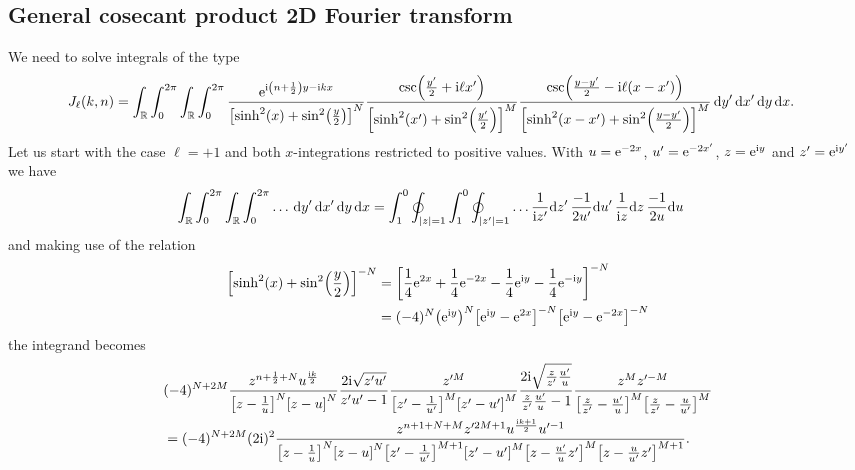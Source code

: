 \documentclass[english, parskip=full]{scrartcl}
\begin{document}
\subsection{General cosecant product 2D Fourier transform}
We need to solve integrals of the type
\begin{align}
J_\ell(k,n) &= \intr{\intx{0}{2\pi}{\intr{\intx{0}{2\pi}{\frac{\powe{\i \kla*{n + \frac{1}{2}}y - \i kx}}{\klb*{\sinh^2(x) + \sin^2\kla*{\frac{y}{2}}}^N} \frac{\csc\kla*{\frac{y'}{2} + \i\ell x'}}{\klb*{\sinh^2(x') + \sin^2\kla*{\frac{y'}{2}}}^M} \frac{\csc\kla*{\frac{y-y'}{2} - \i\ell (x-x')}}{\klb*{\sinh^2(x-x') + \sin^2\kla*{\frac{y-y'}{2}}}^M} }{y'}}{x'} }{y}}{x}.
\end{align}
Let us start with the case $\ell=+1$ and both $x$-integrations restricted to positive values.
With $u = \text{e}^{-2x}$, $u' = \text{e}^{-2x'}$, $z=\text{e}^{\text{i} y}$ and $z'=\text{e}^{\text{i} y'}$ we have
\begin{align}
\int_{\mathbb{R}} \int_{0}^{2\pi} \int_{\mathbb{R}} \int_{0}^{2\pi}  \dots  \,\mathrm{d}y' \, \mathrm{d}x' \,\mathrm{d}y \, \mathrm{d}x &= \int_1^0 \oint_{|z|=1} \int_1^0 \oint_{|z'|=1} \dots \frac{1}{\text{i} z'} \text{d} z'\, \frac{-1}{2u'} \text{d} u'\, \frac{1}{\text{i} z} \text{d} z\, \frac{-1}{2u} \text{d} u
\end{align}
and making use of the relation
\begin{align}
\klb*{\sinh^2(x) + \sin^2\kla*{\frac{y}{2}}}^{-N} &= \klb*{\frac{1}{4} \powe{2x} + \frac{1}{4} \powe{-2x} - \frac{1}{4} \powe{\i y} - \frac{1}{4} \powe{-\i y}}^{-N} \\
&= (-4)^N \kla*{\powe{\i y}}^N \klb*{\powe{\i y} - \powe{2x}}^{-N} \klb*{\powe{\i y} - \powe{-2x}}^{-N}
\end{align}
the integrand becomes
\begin{align}
&(-4)^{N+2M} \frac{z^{n+\frac{1}{2}+N} u^\frac{\i k}{2} }{\klb*{z-\frac{1}{u}}^N \klb*{z - u}^N} \frac{2\i \sqrt{z'u'}}{z'u' - 1} \frac{z'^M}{\klb*{z' - \frac{1}{u'}}^M \klb*{z' - u'}^M}  \frac{2\i \sqrt{\frac{z}{z'} \frac{u'}{u}}}{ \frac{z}{z'} \frac{u'}{u} - 1} \frac{z^M z'^{-M}}{\klb*{\frac{z}{z'} - \frac{u'}{u}}^M \klb*{\frac{z}{z'} - \frac{u}{u'}}^M}\\
&= (-4)^{N+2M} (2\i)^2 \frac{z^{n+1+N+M} z'^{2M+1} u^{\frac{\i k + 1}{2}} u'^{-1}}{\klb*{z-\frac{1}{u}}^N \klb*{z - u}^N \klb*{z' - \frac{1}{u'}}^{M+1} \klb*{z' - u'}^M \klb*{z - \frac{u'}{u} z'}^{M} \klb*{z - \frac{u}{u'} z'}^{M+1}}.
\end{align}
\end{document}
